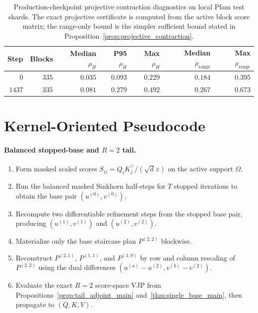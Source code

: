 \documentclass{article}
\begin{document}
\begin{table}[h]
    \centering
    \begin{tabular}{@{}rrrrrrr@{}}
        \toprule
        Step & Blocks & Median $\rho_H$ & P95 $\rho_H$ & Max $\rho_H$ & Median $\rho_{\mathrm{range}}$ & Max $\rho_{\mathrm{range}}$ \\
        \midrule
        $0$ & $335$ & $0.035$ & $0.093$ & $0.229$ & $0.184$ & $0.395$ \\
        $1437$ & $335$ & $0.081$ & $0.279$ & $0.492$ & $0.267$ & $0.673$ \\
        \bottomrule
    \end{tabular}
    \caption{Production-checkpoint projective contraction diagnostics on local Pfam test shards. The exact projective certificate is computed from the active block score matrix; the range-only bound is the simpler sufficient bound stated in Proposition~\ref{prop:projective_contraction}.}
    \label{tab:pfam_projective_certificate}
\end{table}

\section{Kernel-Oriented Pseudocode}

\paragraph{Balanced stopped-base and $R=2$ tail.}
\begin{enumerate}
    \item Form masked scaled scores $S_{ij}=Q_iK_j^\top/(\sqrt{d}\,\varepsilon)$ on the active support $\Omega$.
    \item Run the balanced masked Sinkhorn half-steps for $T$ stopped iterations to obtain the base pair $(u^{(0)},v^{(0)})$.
    \item Recompute two differentiable refinement steps from the stopped base pair, producing $(u^{(1)},v^{(1)})$ and $(u^{(2)},v^{(2)})$.
    \item Materialize only the base staircase plan $P^{(2,2)}$ blockwise.
    \item Reconstruct $P^{(2,1)}$, $P^{(1,1)}$, and $P^{(1,0)}$ by row and column rescaling of $P^{(2,2)}$ using the dual differences $(u^{(a)}-u^{(2)}, v^{(b)}-v^{(2)})$.
    \item Evaluate the exact $R=2$ score-space VJP from Propositions~\ref{prop:tail_adjoint_main} and~\ref{thm:single_base_main}, then propagate to $(Q,K,V)$.
\end{enumerate}
\end{document}

